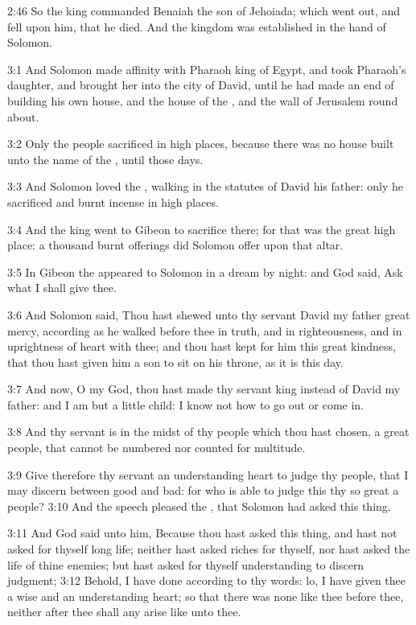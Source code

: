 2:46 So the king commanded Benaiah the son of Jehoiada; which went
out, and fell upon him, that he died. And the kingdom was established
in the hand of Solomon.

3:1 And Solomon made affinity with Pharaoh king of Egypt, and took
Pharaoh's daughter, and brought her into the city of David, until he
had made an end of building his own house, and the house of the \LORD,
and the wall of Jerusalem round about.

3:2 Only the people sacrificed in high places, because there was no
house built unto the name of the \LORD, until those days.

3:3 And Solomon loved the \LORD, walking in the statutes of David his
father: only he sacrificed and burnt incense in high places.

3:4 And the king went to Gibeon to sacrifice there; for that was the
great high place: a thousand burnt offerings did Solomon offer upon
that altar.

3:5 In Gibeon the \LORD appeared to Solomon in a dream by night: and
God said, Ask what I shall give thee.

3:6 And Solomon said, Thou hast shewed unto thy servant David my
father great mercy, according as he walked before thee in truth, and
in righteousness, and in uprightness of heart with thee; and thou hast
kept for him this great kindness, that thou hast given him a son to
sit on his throne, as it is this day.

3:7 And now, O \LORD my God, thou hast made thy servant king instead of
David my father: and I am but a little child: I know not how to go out
or come in.

3:8 And thy servant is in the midst of thy people which thou hast
chosen, a great people, that cannot be numbered nor counted for
multitude.

3:9 Give therefore thy servant an understanding heart to judge thy
people, that I may discern between good and bad: for who is able to
judge this thy so great a people?  3:10 And the speech pleased the
\LORD, that Solomon had asked this thing.

3:11 And God said unto him, Because thou hast asked this thing, and
hast not asked for thyself long life; neither hast asked riches for
thyself, nor hast asked the life of thine enemies; but hast asked for
thyself understanding to discern judgment; 3:12 Behold, I have done
according to thy words: lo, I have given thee a wise and an
understanding heart; so that there was none like thee before thee,
neither after thee shall any arise like unto thee.

